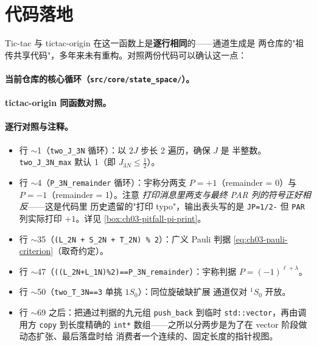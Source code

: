 \section{代码落地}
\label{sec:ch03-code}

Tic-tac 与 tictac-origin 在这一函数上是\textbf{逐行相同}的——通道生成是
两仓库的"祖传共享代码"，多年来未有重构。对照两份代码可以确认这一点：

\paragraph{当前仓库的核心循环（\texttt{src/core/state\_space/}）。}


\paragraph{tictac-origin 同函数对照。}


\paragraph{逐行对照与注释。}
\begin{itemize}
  \item 行 \(\sim\)1（\verb|two_J_3N| 循环）：以 \(2J\) 步长 2 遍历，确保 \(J\) 是
        半整数。\verb|two_J_3N_max| 默认 1（即 \(J_{3N} \le \tfrac{1}{2}\)）。
  \item 行 \(\sim\)4（\verb|P_3N_remainder| 循环）：宇称分两支
        \(P = +1\)（remainder = 0）与 \(P = -1\)（remainder = 1）。注意
        \emph{打印消息里两支与最终 PAR 列的符号正好相反}——这是代码里
        历史遗留的"打印 typo"，输出表头写的是 \verb|JP=1/2-| 但
        \verb|PAR| 列实际打印 \(+1\)。详见
        \cref{box:ch03-pitfall-pi-print}。
  \item 行 \(\sim\)35（\verb|(L_2N + S_2N + T_2N) % 2|）：广义 Pauli 判据
        \cref{eq:ch03-pauli-criterion}（取奇约定）。
  \item 行 \(\sim\)47（\verb|((L_2N+L_1N)%2)==P_3N_remainder|）：宇称判据
        \(P = (-1)^{\ell + \lambda}\)。
  \item 行 \(\sim\)50（\verb|two_T_3N==3| 单挑 \(1S_0\)）：同位旋破缺扩展
        通道仅对 \({}^1S_0\) 开放。
  \item 行 \(\sim\)69 之后：把通过判据的九元组 \verb|push_back| 到临时
        \verb|std::vector|，再由调用方 \texttt{copy} 到长度精确的 \texttt{int*}
        数组——之所以分两步是为了在 vector 阶段做动态扩张、最后落盘时给
        消费者一个连续的、固定长度的指针视图。
\end{itemize}

